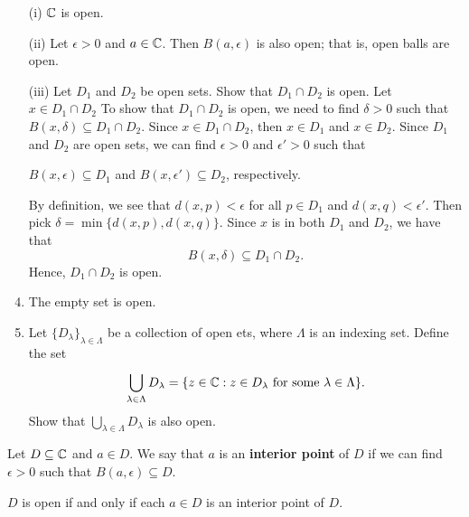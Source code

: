 \documentclass[a4paper]{report}
\begin{document}
\begin{eg}
    \begin{enumerate}
        \item[(i)] \( \mathbb{C}  \) is open.
        \item[(ii)] Let \( \epsilon > 0  \) and \( a \in \mathbb{C}  \). Then \( B(a,\epsilon)  \) is also open; that is, open balls are open.
        \item[(iii)] Let \( {D}_{1} \) and \( {D}_{2} \) be open sets.
            Show that \( {D}_{1} \cap {D}_{2} \) is open. Let \( x \in {D}_{1} \cap {D}_{2} \) To show that \( {D}_{1} \cap {D}_{2} \) is open, we need to find \( \delta > 0  \) such that \( B(x,\delta) \subseteq {D}_{1} \cap {D}_{2} \). Since \( x \in {D}_{1} \cap {D}_{2} \), then \( x \in {D}_{1} \) and \( x \in {D}_{2} \). Since \( {D}_{1} \) and \( {D}_{2} \) are open sets, we can find \( \epsilon > 0  \) and \( \epsilon' > 0  \) such that 
            \begin{center}
               \( B(x,\epsilon) \subseteq {D}_{1} \) and \( B(x, \epsilon') \subseteq  {D}_{2} \), respectively. 
            \end{center} By definition, we see that \( d(x,p) < \epsilon \) for all \( p \in {D}_{1} \) and \( d(x,q) < \epsilon' \). Then pick \( \delta = \min \{ d(x,p), d(x,q) \}  \). Since \( x  \) is in both \( {D}_{1} \) and \( {D}_{2} \), we have that 
            \[  B(x,\delta) \subseteq  {D}_{1} \cap {D}_{2}. \]
            Hence, \( {D}_{1} \cap {D}_{2} \) is open.
        \item The empty set is open.
        \item Let \( \{ {D}_{\lambda}  \}_{\lambda \in \Lambda} \) be a collection of open ets, where \( \Lambda \) is an indexing set. Define the set
            \[  \bigcup_{ \lambda \in \Lambda }^{  }  {D}_{\lambda} = \{ z \in \mathbb{C} : z \in {D}_{\lambda} \ \text{for some} \ \lambda \in \Lambda \}. \]
            Show that \( \bigcup_{ \lambda \in \Lambda }^{  } {D}_{\lambda}  \) is also open.
    \end{enumerate}
\end{eg}

\begin{definition}
  Let \( D \subseteq \mathbb{C} \) and \( a \in D  \). We say that \( a  \) is an \textbf{interior point} of \( D  \) if we can find \( \epsilon > 0  \) such that \( B(a, \epsilon) \subseteq  D  \).
\end{definition}

\begin{prop}
    \( D  \) is open if and only if each \( a \in D  \) is an interior point of \( D  \).
\end{prop}
\end{document}
